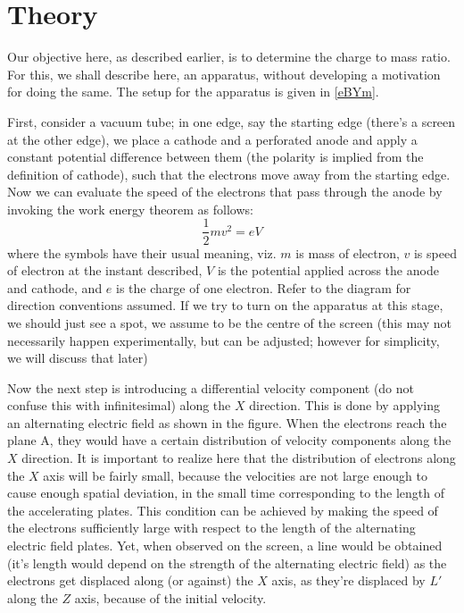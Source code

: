 \section{Theory}
	Our objective here, as described earlier, is to determine the charge to mass ratio. For this, we shall describe here, an apparatus, without developing a motivation for doing the same. The setup for the apparatus is given in \autoref{eBYm}.
	\par
	First, consider a vacuum tube; in one edge, say the starting edge (there's a screen at the other edge), we place a cathode and a perforated anode and apply a constant potential difference between them (the polarity is implied from the definition of cathode), such that the electrons move away from the starting edge. Now we can evaluate the speed of the electrons that pass through the anode by invoking the work energy theorem as follows:
	\begin{equation}
		\frac 1 2 mv^2 = eV
	\end{equation}
	where the symbols have their usual meaning, viz. $m$ is mass of electron, $v$ is speed of electron at the instant described, $V$ is the potential applied across the anode and cathode, and $e$ is the charge of one electron. Refer to the diagram for direction conventions assumed. If we try to turn on the apparatus at this stage, we should just see a spot, we assume to be the centre of the screen (this may not necessarily happen experimentally, but can be adjusted; however for simplicity, we will discuss that later)
	\par
	Now the next step is introducing a differential velocity component (do not confuse this with infinitesimal) along the $X$ direction. This is done by applying an alternating electric field as shown in the figure. When the electrons reach the plane A, they would have a certain distribution of velocity components along the $X$ direction. It is important to realize here that the distribution of electrons along the $X$ axis will be fairly small, because the velocities are not large enough to cause enough spatial deviation, in the small time corresponding to the length of the accelerating plates. This condition can be achieved by making the speed of the electrons sufficiently large with respect to the length of the alternating electric field plates. Yet, when observed on the screen, a line would be obtained (it's length would depend on the strength of the alternating electric field) as the electrons get displaced along (or against) the $X$ axis, as they're displaced by $L'$ along the $Z$ axis, because of the initial velocity.
